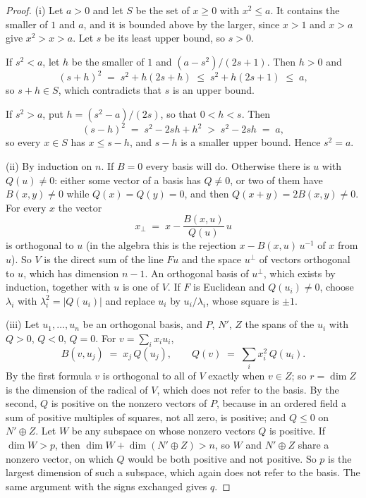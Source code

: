\documentclass[11pt]{article}
\theoremstyle{plain}
\theoremstyle{definition}
\theoremstyle{plain}
\theoremstyle{definition}
\begin{document}
\begin{proof}
(i) Let $a > 0$ and let $S$ be the set of $x \geq 0$ with $x^{2} \leq a$. It contains the smaller of $1$ and $a$, and it is bounded above by the larger, since $x > 1$ and $x > a$ give $x^{2} > x > a$. Let $s$ be its least upper bound, so $s > 0$.

If $s^{2} < a$, let $h$ be the smaller of $1$ and $(a - s^{2})/(2s + 1)$. Then $h > 0$ and
\[
(s + h)^{2} \;=\; s^{2} + h(2s + h) \;\leq\; s^{2} + h(2s + 1) \;\leq\; a ,
\]
so $s + h \in S$, which contradicts that $s$ is an upper bound.

If $s^{2} > a$, put $h = (s^{2} - a)/(2s)$, so that $0 < h < s$. Then
\[
(s - h)^{2} \;=\; s^{2} - 2sh + h^{2} \;>\; s^{2} - 2sh \;=\; a ,
\]
so every $x \in S$ has $x \leq s - h$, and $s - h$ is a smaller upper bound. Hence $s^{2} = a$.

(ii) By induction on $n$. If $B = 0$ every basis will do. Otherwise there is $u$ with $Q(u) \neq 0$: either some vector of a basis has $Q \neq 0$, or two of them have $B(x,y) \neq 0$ while $Q(x) = Q(y) = 0$, and then $Q(x + y) = 2B(x,y) \neq 0$. For every $x$ the vector
\[
x_{\perp} \;=\; x - \frac{B(x,u)}{Q(u)}\,u
\]
is orthogonal to $u$ (in the algebra this is the rejection $x - B(x,u)\,u^{-1}$ of $x$ from $u$). So $V$ is the direct sum of the line $Fu$ and the space $u^{\perp}$ of vectors orthogonal to $u$, which has dimension $n - 1$. An orthogonal basis of $u^{\perp}$, which exists by induction, together with $u$ is one of $V$. If $F$ is Euclidean and $Q(u_{i}) \neq 0$, choose $\lambda_{i}$ with $\lambda_{i}^{2} = |Q(u_{i})|$ and replace $u_{i}$ by $u_{i}/\lambda_{i}$, whose square is $\pm 1$.

(iii) Let $u_{1}, \dots, u_{n}$ be an orthogonal basis, and $P$, $N'$, $Z$ the spans of the $u_{i}$ with $Q > 0$, $Q < 0$, $Q = 0$. For $v = \sum_{i} x_{i}u_{i}$,
\[
B(v, u_{j}) \;=\; x_{j}\,Q(u_{j}), \qquad Q(v) \;=\; \sum_{i} x_{i}^{2}\,Q(u_{i}) .
\]
By the first formula $v$ is orthogonal to all of $V$ exactly when $v \in Z$; so $r = \dim Z$ is the dimension of the radical of $V$, which does not refer to the basis. By the second, $Q$ is positive on the nonzero vectors of $P$, because in an ordered field a sum of positive multiples of squares, not all zero, is positive; and $Q \leq 0$ on $N' \oplus Z$. Let $W$ be any subspace on whose nonzero vectors $Q$ is positive. If $\dim W > p$, then $\dim W + \dim(N' \oplus Z) > n$, so $W$ and $N' \oplus Z$ share a nonzero vector, on which $Q$ would be both positive and not positive. So $p$ is the largest dimension of such a subspace, which again does not refer to the basis. The same argument with the signs exchanged gives $q$.


\end{proof}
\end{document}
